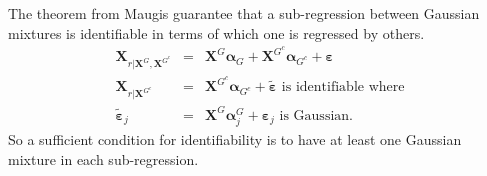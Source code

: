 \documentclass[11pt,a4paper]{article}
\begin{document}
The theorem from Maugis guarantee that a sub-regression between Gaussian mixtures is identifiable in terms of which one is regressed by others.
		\begin{eqnarray}
		 \boldsymbol{X}_{r|\boldsymbol{X}^G,\boldsymbol{X}^{G^c}}&=& \boldsymbol{X}^G\boldsymbol{\alpha}_G+\boldsymbol{X}^{G^c}\boldsymbol{\alpha}_{G^c}+ \boldsymbol{\varepsilon} \\
			\boldsymbol{X}_{r|\boldsymbol{X}^{G^c}}&=& \boldsymbol{X}^{G^c}\boldsymbol{\alpha}_{G^c} + \tilde{\boldsymbol{\varepsilon}} \textrm{ is identifiable where} \\
			\tilde{\boldsymbol{\varepsilon}}_j&=&\boldsymbol{X}^{G}\boldsymbol{\alpha}_j^{G}+ \boldsymbol{\varepsilon}_j \textrm{ is Gaussian.}  
		\end{eqnarray}
		So a sufficient condition for identifiability is to have at least one Gaussian mixture in each sub-regression.
%		
%			
	
\end{document}
